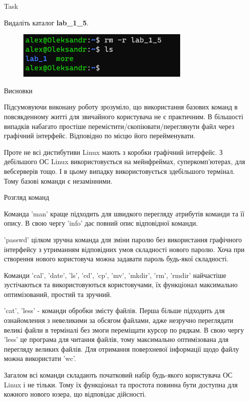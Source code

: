 \documentclass[a4paper,12pt]{article}
\newcommand{\RomanNumeralCaps}[1]{\MakeUppercase{\romannumeral #1}}
\begin{document}
\newpage
    \begin{center}
        \Large{Task \RomanNumeralCaps{19}}
    \end{center}
    Видаліть каталог \textbf{lab\_1\_5}.
    \begin{figure}[h!]
        \begin{minipage}[h]{1\linewidth}
            \centering
            \includegraphics[width=0.6\linewidth]{Prt sc/Figure_19.png}  
        \end{minipage}
    \end{figure}

    \begin{center}
        \Large{Висновки}
    \end{center}

    Підсумовуючи виконану роботу зрозуміло, що використання базових команд в 
    повсякденному житті для звичайного користувача не є практичним. В більшості випадків 
    набагато простіше перемістити/скопіювати/переглянути файл через графічний інтерфейс. 
    Відповідно по місцю його перейменувати.

    Проте не всі дистибутиви Linux мають з коробки графічний інтерфейс. 
    З дебільшого ОС Linux використовується на мейнфреймах, суперкомп'ютерах,
    для вебсерверів тощо. І в цьому випадку використовується здебільшого термінал. 
    Тому базові команди є незамінними.
    \begin{center}
        Розгляд команд
    \end{center}

    Команда 'man' краще підходить для швидкого перегляду атрибутів команди та її опису. 
    В свою чергу 'info' дає повний опис відповідної команди.
    
    'passwd' цілком зручна команда для зміни паролю без використання графічного інтерфейсу
    з утриманням відповідних умов складності нового паролю. Хоча при створення нового 
    користовуча можна задавати пароль будь-якої складності.
    
    Команди 'cal', 'date', 'ls', 'cd', 'cp', 'mv', 'mkdir', 'rm', 'rmdir' найчастіше
    зустічаються та використовуються користовучами, їх функціонал максимально оптимізований,
    простий та зручний.
    
    'cat', 'less' - команди обробки змісту файлів. Перша більше підходить для ознайомлення з 
    невеликими за обсягом файлами, адже незручно переглядати великі файли в терміналі без
    змоги переміщати курсор по рядкам. В свою чергу 'less' це програма для читання файлів,
    тому максимально оптимізована для перегляду великих файлів. Для отримання поверхневої
    інформації щодо файлу можна використати 'wc'.
    
    Загалом всі команди складають початковий набір будь-якого користувача ОС Linux і не тільки. 
    Тому їх функціонал та простота повинна бути доступна для кожного нового юзера, що відповідає дійсності.
\end{document}
